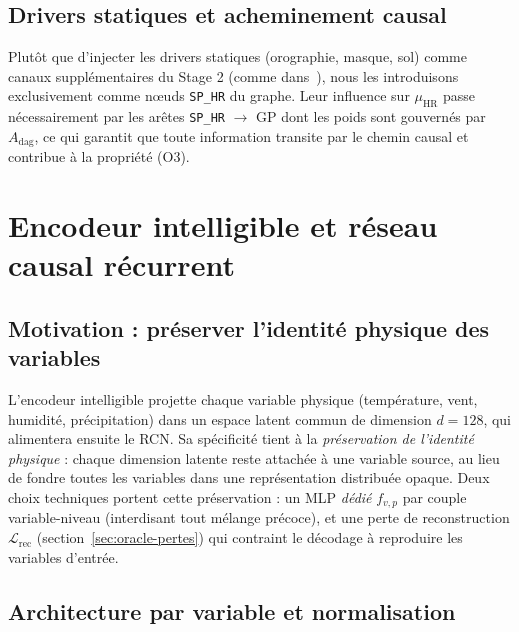 \documentclass[14pt,a4paper,openany]{extreport}
\theoremstyle{definition}
\newcommand{\HR}{\ensuremath{\text{HR}}}
\newcommand{\muHR}{\ensuremath{\mu_{\HR}}}
\newcommand{\Adag}{\ensuremath{A_{\mathrm{dag}}}}
\newcommand{\Lrec}{\ensuremath{\mathcal{L}_{\mathrm{rec}}}}
\begin{document}
\subsection{Drivers statiques et acheminement causal}
\label{ssec:oracle-statics}

Plutôt que d'injecter les drivers statiques (orographie, masque, sol) comme canaux supplémentaires du Stage 2 (comme dans~\cite{rampal_cgan_2024}), nous les introduisons exclusivement comme nœuds \texttt{SP\_HR} du graphe. Leur influence sur $\muHR$ passe nécessairement par les arêtes \texttt{SP\_HR} $\to$ GP dont les poids sont gouvernés par $\Adag$, ce qui garantit que toute information transite par le chemin causal et contribue à la propriété (O3).

\section{Encodeur intelligible et réseau causal récurrent}
\label{sec:oracle-encoder}

\subsection{Motivation : préserver l'identité physique des variables}
\label{ssec:oracle-encoder-motivation}

L'encodeur intelligible projette chaque variable physique (température, vent, humidité, précipitation) dans un espace latent commun de dimension $d=128$, qui alimentera ensuite le RCN. Sa spécificité tient à la \emph{préservation de l'identité physique} : chaque dimension latente reste attachée à une variable source, au lieu de fondre toutes les variables dans une représentation distribuée opaque. Deux choix techniques portent cette préservation : un MLP \emph{dédié} $f_{v,p}$ par couple variable-niveau (interdisant tout mélange précoce), et une perte de reconstruction $\Lrec$ (section~\ref{sec:oracle-pertes}) qui contraint le décodage à reproduire les variables d'entrée.

\subsection{Architecture par variable et normalisation}
\label{ssec:oracle-encoder-archi}
\end{document}
